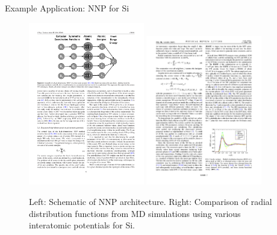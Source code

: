 \documentclass{beamer}
\begin{document}
\begin{frame}{Example Application: NNP for Si}
    \begin{figure}
        \centering
        \includegraphics[width=0.45\textwidth]{figures/nnp.pdf}
        \includegraphics[width=0.45\textwidth]{figures/nnp-si.pdf}
        \caption{Left: Schematic of NNP architecture. Right: Comparison of radial distribution functions from MD simulations using various interatomic potentials for Si.\cite{behlerGeneralizedNeuralNetworkRepresentation2007}}
        \label{fig:my_label}
    \end{figure}
\end{frame}
\end{document}
